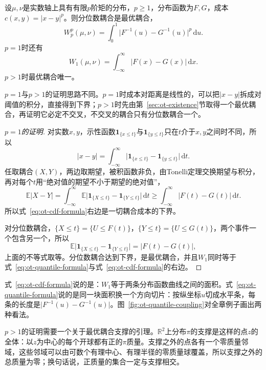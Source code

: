 \begin{theorem}[一维最优运输]
\label{thm:ot-one-dimensional}
设$\mu,\nu$是实数轴上具有有限$p$阶矩的分布，$p\geq1$，分布函数为$F,G$，成本$c(x,y)=\lvert x-y\rvert^{p}$。则分位数耦合是最优耦合，
\begin{equation}
 W_p^{p}(\mu,\nu)=\int_0^{1}\bigl\lvert F^{-1}(u)-G^{-1}(u)\bigr\rvert^{p}\,\mathrm{d}u .
 \label{eq:ot-quantile-formula}
\end{equation}
$p=1$时还有
\begin{equation}
 W_1(\mu,\nu)=\int_{-\infty}^{\infty}\bigl\lvert F(x)-G(x)\bigr\rvert\,\mathrm{d}x .
 \label{eq:ot-cdf-formula}
\end{equation}
$p>1$时最优耦合唯一。
\end{theorem}

$p=1$与$p>1$的证明思路不同。$p=1$时成本对距离是线性的，可以把$\lvert x-y\rvert$拆成对阈值的积分，直接得到下界；$p>1$时先由第~\ref{sec:ot-existence}节取得一个最优耦合，再证明它必定不交叉，不交叉的耦合只有分位数耦合一个。

\begin{proof}[$p=1$的证明]
对实数$x,y$，示性函数$\mathbf{1}_{\{x\leq t\}}$与$\mathbf{1}_{\{y\leq t\}}$只在$t$介于$x,y$之间时不同，所以
\[
 \lvert x-y\rvert=\int_{-\infty}^{\infty}\bigl\lvert\mathbf{1}_{\{x\leq t\}}-\mathbf{1}_{\{y\leq t\}}\bigr\rvert\,\mathrm{d}t .
\]
任取耦合$(X,Y)$，两边取期望，被积函数非负，由Tonelli定理交换期望与积分，再对每个$t$用“绝对值的期望不小于期望的绝对值”，
\[
 \mathbb{E}\lvert X-Y\rvert=\int_{-\infty}^{\infty}\mathbb{E}\bigl\lvert\mathbf{1}_{\{X\leq t\}}-\mathbf{1}_{\{Y\leq t\}}\bigr\rvert\,\mathrm{d}t\geq\int_{-\infty}^{\infty}\lvert F(t)-G(t)\rvert\,\mathrm{d}t .
\]
所以式~\eqref{eq:ot-cdf-formula}右边是一切耦合成本的下界。

对分位数耦合，$\{X\leq t\}=\{U\leq F(t)\}$，$\{Y\leq t\}=\{U\leq G(t)\}$，两个事件一个包含另一个，所以
\[
 \mathbb{E}\bigl\lvert\mathbf{1}_{\{X\leq t\}}-\mathbf{1}_{\{Y\leq t\}}\bigr\rvert=\bigl\lvert F(t)-G(t)\bigr\rvert ,
\]
上面的不等式取等。分位数耦合达到下界，是最优耦合，并且$W_1$同时等于式~\eqref{eq:ot-quantile-formula}与式~\eqref{eq:ot-cdf-formula}的右边。
\end{proof}

式~\eqref{eq:ot-cdf-formula}说的是：$W_1$等于两条分布函数曲线之间的面积。式~\eqref{eq:ot-quantile-formula}说的是同一块面积换一个方向切片：按纵坐标$u$切成水平条，每条的长度是$\lvert F^{-1}(u)-G^{-1}(u)\rvert$。图~\ref{fig:ot-quantile-coupling}对全章例子画出两种看法。

$p>1$的证明需要一个关于最优耦合支撑的引理。$\mathbb{R}^{2}$上分布$\pi$的支撑是这样的点$z$的全体：以$z$为中心的每个开球都有正的$\pi$质量。支撑之外的点各有一个零质量邻域，这些邻域可以由可数个有理中心、有理半径的零质量球覆盖，所以支撑之外的总质量为零；换句话说，正质量的集合一定与支撑相交。

